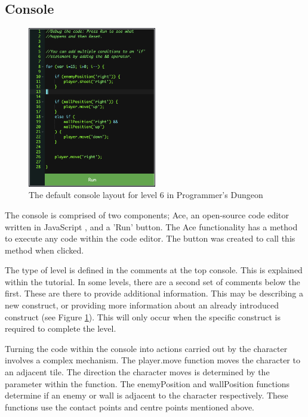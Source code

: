 \documentclass[a4paper,11.5pt]{report}
\numberwithin{figure}{section}
\numberwithin{table}{section}
\numberwithin{equation}{section}
\numberwithin{equation}{section}
\begin{document}
\subsection{Console}

\begin{figure}
    \includegraphics[width=0.5\textwidth]{consolelevelsix}
       \captionsetup{justification=centering}
\caption{The default console layout for level 6 in Programmer's Dungeon}
\label{fig:consolelevelsix}
\end{figure}

The console is comprised of two components; Ace, an open-source code editor written in JavaScript \citep{ace}, and a 'Run' button. The Ace functionality has a method to execute any code within the code editor. The button was created to call this method when clicked.

The type of level is defined in the comments at the top console. This is explained within the tutorial. In some levels, there are a second set of comments below the first. These are there to provide additional information. This may be describing a new construct, or providing more information about an already introduced construct (see Figure \ref{fig:consolelevelsix}). This will only occur when the specific construct is required to complete the level.

Turning the code within the console into actions carried out by the character involves a complex mechanism. The player.move function moves the character to an adjacent tile. The direction the character moves is determined by the parameter within the function. The enemyPosition and wallPosition functions determine if an enemy or wall is adjacent to the character respectively. These functions use the contact points and centre points mentioned above.
\end{document}
